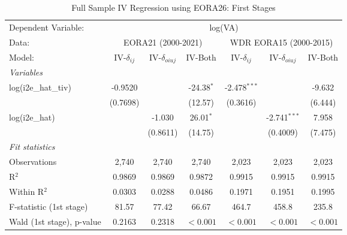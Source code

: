 \documentclass[a4paper]{article}
\begin{document}
\begin{table}[h!]
   \caption{\label{tab:FS_RES_F1} Full Sample IV Regression using EORA26: First Stages}
   \centering
   \begin{tabular}{lcccccc}
      \tabularnewline \midrule \midrule
      Dependent Variable: & \multicolumn{6}{c}{log(VA)}\\
      Data: & \multicolumn{3}{c}{EORA21 (2000-2021)} & \multicolumn{3}{c}{WDR EORA15 (2000-2015)} \\
      Model:                   & IV-$\delta_{ij}$      & IV-$\delta_{oiuj}$    & IV-Both              & IV-$\delta_{ij}$      & IV-$\delta_{oiuj}$    & IV-Both\\  
      \midrule
      \emph{Variables}\\
      log(i2e\_hat\_tiv)        & -0.9520               &                        & -24.38$^{*}$           & -2.478$^{***}$        &                        & -9.632\\   
                                & (0.7698)              &                        & (12.57)                & (0.3616)              &                        & (6.444)\\   
      log(i2e\_hat)             &                       & -1.030                 & 26.01$^{*}$            &                       & -2.741$^{***}$         & 7.958\\   
                                &                       & (0.8611)               & (14.75)                &                       & (0.4009)               & (7.475)\\  
      \emph{Fit statistics}\\
      Observations              & 2,740                 & 2,740                  & 2,740                  & 2,023                 & 2,023                  & 2,023\\  
      R$^2$                     & 0.9869                & 0.9869                 & 0.9872                 & 0.9915                & 0.9915                 & 0.9915\\  
      Within R$^2$              & 0.0303                & 0.0288                 & 0.0486                 & 0.1971                & 0.1951                 & 0.1995\\  
      F-statistic (1st stage)        & 81.57                 & 77.42                  & 66.67                  & 464.7                 & 458.8                  & 235.8\\  
      Wald (1st stage), p-value & 0.2163                & 0.2318                 & $<0.001$  & $<0.001$  & $<0.001$  & $<0.001$\\       

\end{tabular}
\end{table}
\end{document}
